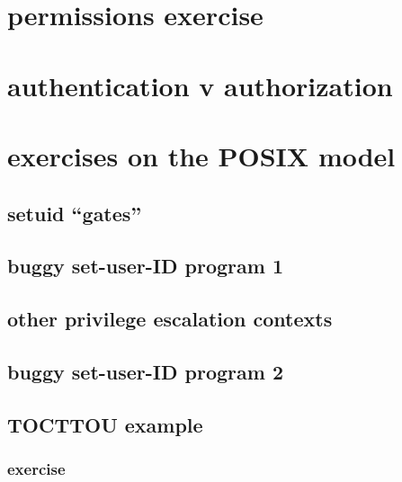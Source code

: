 \section{permissions exercise}


\section{authentication v authorization}


\section{exercises on the POSIX model}


\subsection{setuid ``gates''}


\subsection{buggy set-user-ID program 1}


\subsection{other privilege escalation contexts}


\subsection{buggy set-user-ID program 2}


\subsection{TOCTTOU example}




\subsubsection{exercise}

